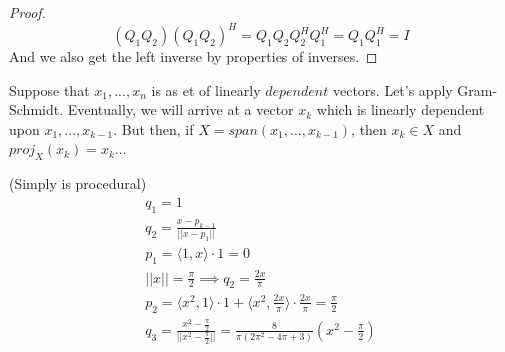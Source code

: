\documentclass[12pt]{article}
\newenvironment{problem}[2][Problem]{\begin{trivlist}
\item[\hskip \labelsep {\bfseries #1}\hskip \labelsep {\bfseries #2.}]}{\end{trivlist}}
\theoremstyle{definition}
\theoremstyle{definition}
\theoremstyle{definition}
\theoremstyle{definition}
\begin{document}
\begin{problem}{3.10}
\begin{itemize}
\begin{proof}
$$
(Q_1Q_2)(Q_1Q_2)^H = Q_1Q_2Q_2^HQ_1^H = Q_1Q_1^H = I
$$
And we also get the left inverse by properties of inverses.
\end{proof}
\end{itemize}
\end{problem}
\begin{problem}{3.11}
Suppose that $x_1, ... , x_n$ is as et of linearly $\textit{dependent}$ vectors. Let's apply Gram-Schmidt. Eventually, we will arrive at a vector $x_k$ which is linearly dependent upon $x_1, ..., x_{k-1}$. But then, if $X = span(x_1, ..., x_{k-1}) $, then $x_k \in X$ and $proj_X(x_k) = x_k$... 
\end{problem}

\begin{problem}{3.13} (Simply is procedural)
\begin{align*}
q_1 = 1 \\
q_2 = \frac{x - p_{k-1}}{||x - p_{1}||} \\
p_1 = \langle 1, x \rangle \cdot 1 = 0 \\
|| x || = \frac{\pi}{2} \implies q_2 = \frac{2x}{\pi} \\
p_2 = \langle x^2, 1 \rangle \cdot 1
 + \langle x^2,\frac{2x}{\pi} \rangle \cdot \frac{2x}{\pi} = \frac{\pi}{2} \\
 q_3 = \frac{x^2 - \frac{\pi}{2}}{||x^2 - \frac{\pi}{2}||} = \frac{8}{\pi (2 \pi^2 - 4 \pi + 3)}(x^2 - \frac{\pi}{2})
\end{align*}
\end{problem}
\end{document}
